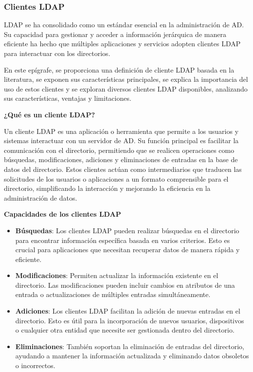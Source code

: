 \subsubsection{Clientes LDAP}

LDAP se ha consolidado como un estándar esencial en la administración de AD. Su capacidad para gestionar y acceder a información jerárquica de manera eficiente ha hecho que múltiples aplicaciones y servicios adopten clientes LDAP para interactuar con los directorios.

En este epígrafe, se proporciona una definición de cliente LDAP basada en la literatura, se exponen sus características principales, se explica la importancia del uso de estos clientes y se exploran diversos clientes LDAP disponibles, analizando sus características, ventajas y limitaciones.

\textbf{¿Qué es un cliente LDAP?}

Un cliente LDAP es una aplicación o herramienta que permite a los usuarios y sistemas interactuar con un servidor de AD. Su función principal es facilitar la comunicación con el directorio, permitiendo que se realicen operaciones como búsquedas, modificaciones, adiciones y eliminaciones de entradas en la base de datos del directorio. Estos clientes actúan como intermediarios que traducen las solicitudes de los usuarios o aplicaciones a un formato comprensible para el directorio, simplificando la interacción y mejorando la eficiencia en la administración de datos.

\textbf{Capacidades de los clientes LDAP}
\begin{itemize}
    \item \textbf{Búsquedas}: Los clientes LDAP pueden realizar búsquedas en el directorio para encontrar información específica basada en varios criterios. Esto es crucial para aplicaciones que necesitan recuperar datos de manera rápida y eficiente.
    \item \textbf{Modificaciones}: Permiten actualizar la información existente en el directorio. Las modificaciones pueden incluir cambios en atributos de una entrada o actualizaciones de múltiples entradas simultáneamente.
    \item \textbf{Adiciones}: Los clientes LDAP facilitan la adición de nuevas entradas en el directorio. Esto es útil para la incorporación de nuevos usuarios, dispositivos o cualquier otra entidad que necesite ser gestionada dentro del directorio.
    \item \textbf{Eliminaciones}: También soportan la eliminación de entradas del directorio, ayudando a mantener la información actualizada y eliminando datos obsoletos o incorrectos.
\end{itemize}

